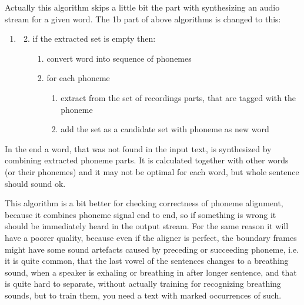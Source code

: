 \documentclass[12pt,a4paper,english]{article}
\begin{document}
Actually this algorithm skips a little bit the part with synthesizing an audio stream for a given word.
The 1b part of above algorithms is changed to this:

\begin{enumerate}
\item
    \begin{enumerate}
        \setcounter{enumii}{1}
        \item if the extracted set is empty then:
        \begin{enumerate}
            \item convert word into sequence of phonemes
            \item for each phoneme
            \begin{enumerate}
                \item extract from the set of recordings parts, that are tagged with the phoneme
                \item add the set as a candidate set with phoneme as new word
            \end{enumerate}
        \end{enumerate}
    \end{enumerate}
\end{enumerate}

In the end a word, that was not found in the input text, is synthesized by combining extracted phoneme parts. \newline
It is calculated together with other words (or their phonemes) and it may not be optimal for each word, but whole sentence should sound ok. \newline
\newline

This algorithm is a bit better for checking correctness of phoneme alignment, because it combines phoneme signal end to end, so if something is wrong it should be immediately heard in the output stream. \newline
For the same reason it will have a poorer quality, because even if the aligner is perfect, the boundary frames might have some sound artefacts caused by preceding or succeeding phoneme, i.e. it is quite common, that the last vowel of the sentences changes to a breathing sound, when a speaker is exhaling or breathing in after longer sentence, and that is quite hard to separate, without actually training for recognizing breathing sounds, but to train them, you need a text with marked occurrences of such. \newline
\newline
\end{document}
